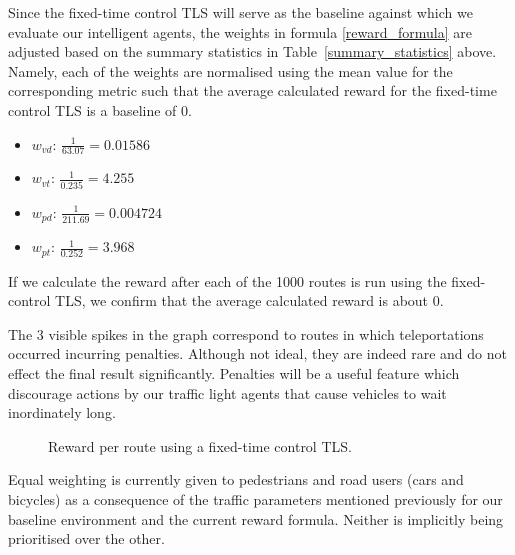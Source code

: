 \documentclass[a4paper]{report}
\begin{document}
Since the fixed-time control TLS will serve as the baseline against which we evaluate our intelligent agents, the weights in formula \eqref{reward_formula} are adjusted based on the summary statistics in Table~\ref{summary_statistics} above. Namely, each of the weights are normalised using the mean value for the corresponding metric such that the average calculated reward for the fixed-time control TLS is a baseline of 0.

\begin{itemize}
  \item $w_{vd}$: $\frac{1}{63.07}=0.01586$
  \item $w_{vt}$: $\frac{1}{0.235}=4.255$
  \item $w_{pd}$: $\frac{1}{211.69}=0.004724$
  \item $w_{pt}$: $\frac{1}{0.252}=3.968$
\end{itemize}

If we calculate the reward after each of the 1000 routes is run using the fixed-control TLS, we confirm that the average calculated reward is about 0.

The 3 visible spikes in the graph correspond to routes in which teleportations occurred incurring penalties. Although not ideal, they are indeed rare and do not effect the final result significantly. Penalties will be a useful feature which discourage actions by our traffic light agents that cause vehicles to wait inordinately long.

\begin{figure}[H]
  \centering
  \caption{Reward per route using a fixed-time control TLS.}
\end{figure}

Equal weighting is currently given to pedestrians and road users (cars and bicycles) as a consequence of the traffic parameters mentioned previously for our baseline environment and the current reward formula. Neither is implicitly being prioritised over the other.
\end{document}

